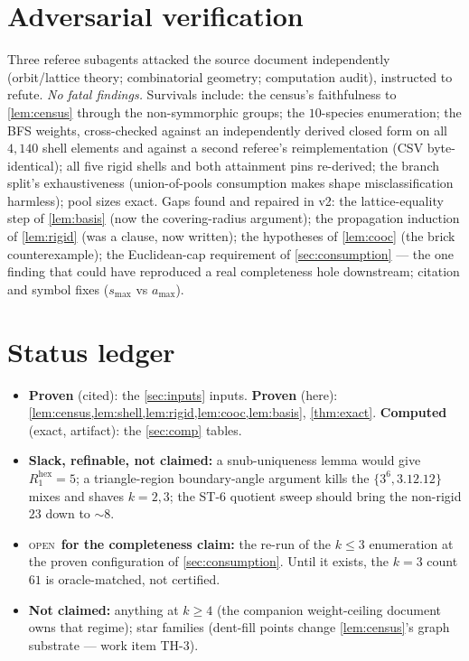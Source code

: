 \documentclass[11pt,a4paper,oneside]{article}
\theoremstyle{plain}
\theoremstyle{definition}
\theoremstyle{remark}
\newcommand{\statOPEN}{\textcolor{red!60!black}{\textsc{open}}}
\begin{document}
\section{Adversarial verification}\label{sec:adversarial}

Three referee subagents attacked the source document independently (orbit/lattice theory;
combinatorial geometry; computation audit), instructed to refute. \emph{No fatal findings.}
Survivals include: the census's faithfulness to \cref{lem:census} through the non-symmorphic
groups; the $10$-species enumeration; the BFS weights, cross-checked against an
independently derived closed form on all $4{,}140$ shell elements and against a second
referee's reimplementation (CSV byte-identical); all five rigid shells and both attainment
pins re-derived; the branch split's exhaustiveness (union-of-pools consumption makes shape
misclassification harmless); pool sizes exact. Gaps found and repaired in v2: the
lattice-equality step of \cref{lem:basis} (now the covering-radius argument); the
propagation induction of \cref{lem:rigid} (was a clause, now written); the hypotheses of
\cref{lem:cooc} (the brick counterexample); the Euclidean-cap requirement of
\cref{sec:consumption} --- the one finding that could have reproduced a real completeness
hole downstream; citation and symbol fixes ($s_{\max}$ vs $a_{\max}$).

\section{Status ledger}\label{sec:status}

\begin{itemize}[leftmargin=2em,itemsep=2pt]
\item \textbf{Proven} (cited): the \cref{sec:inputs} inputs. \textbf{Proven} (here):
\cref{lem:census,lem:shell,lem:rigid,lem:cooc,lem:basis}, \cref{thm:exact}.
\textbf{Computed} (exact, artifact): the \cref{sec:comp} tables.
\item \textbf{Slack, refinable, not claimed:} a snub-uniqueness lemma would give
$R_1^{\mathrm{hex}} = 5$; a triangle-region boundary-angle argument kills the
$\{3^6, 3.12.12\}$ mixes and shaves $k = 2, 3$; the ST-6 quotient sweep should bring the
non-rigid $23$ down to ${\sim}8$.
\item \statOPEN\ \textbf{for the completeness claim:} the re-run of the $k \le 3$
enumeration at the proven configuration of \cref{sec:consumption}. Until it exists, the
$k=3$ count $61$ is oracle-matched, not certified.
\item \textbf{Not claimed:} anything at $k \ge 4$ (the companion weight-ceiling document
owns that regime); star families (dent-fill points change \cref{lem:census}'s graph
substrate --- work item TH-3).
\end{itemize}
\end{document}
